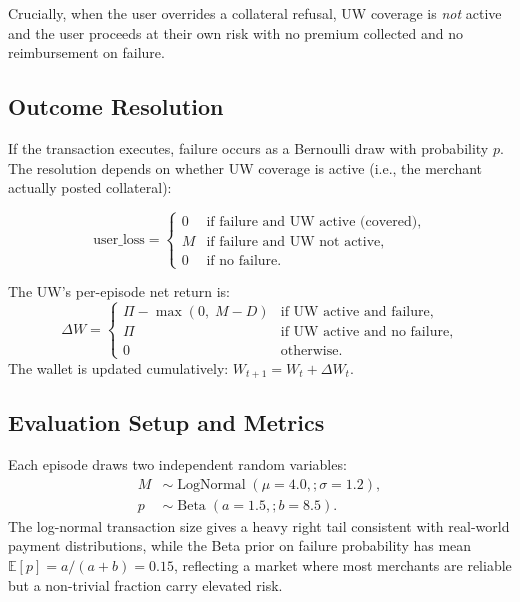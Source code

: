\documentclass{article} %
\begin{document}
Crucially, when the user overrides a collateral refusal, UW coverage is
\emph{not} active and the user proceeds at their own risk with no premium
collected and no reimbursement on failure.

\subsection{Outcome Resolution}\label{sec:sim-resolution}

If the transaction executes, failure occurs as a Bernoulli draw with
probability $p$. The resolution depends on whether UW coverage is active
(i.e., the merchant actually posted collateral):

\begin{equation}\label{eq:resolution}
\text{user\_loss} =
\begin{cases}
  0   & \text{if failure and UW active (covered)}, \\
  M   & \text{if failure and UW not active}, \\
  0   & \text{if no failure}.
\end{cases}
\end{equation}

The UW's per-episode net return is:
\begin{equation}\label{eq:uw-net}
  \Delta W =
  \begin{cases}
    \Pi - \max(0,\; M - D) & \text{if UW active and failure}, \\
    \Pi                     & \text{if UW active and no failure}, \\
    0                       & \text{otherwise}.
  \end{cases}
\end{equation}
The wallet is updated cumulatively: $W_{t+1} = W_t + \Delta W_t$.



\subsection{Evaluation Setup and Metrics}

Each episode draws two independent random variables:
\begin{align}
M &\sim \operatorname{LogNormal}(\mu = 4.0,; \sigma = 1.2), \label{eq:money}\\
p &\sim \operatorname{Beta}(a = 1.5,; b = 8.5). \label{eq:ptrue}
\end{align}
The log-normal transaction size gives a heavy right tail consistent with real-world payment distributions, while the Beta prior on failure probability has mean $\mathbb{E}[p] = a/(a+b) = 0.15$, reflecting a market where most merchants are reliable but a non-trivial fraction carry elevated risk.
\end{document}
